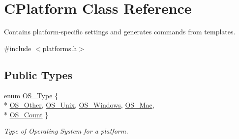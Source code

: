 \hypertarget{classCPlatform}{\section{C\-Platform Class Reference}
\label{classCPlatform}
}


Contains platform-\/specific settings and generates commands from templates.  




{\ttfamily \#include $<$platforms.\-h$>$}

\subsection*{Public Types}
\begin{DoxyCompactItemize}
\item 
enum \hyperlink{classCPlatform_a2fb735c63c53052f79629e338bb0f535}{O\-S\-\_\-\-Type} \{ \\*
\hyperlink{classCPlatform_a2fb735c63c53052f79629e338bb0f535a46c8caab43a05219980b2429a14ed464}{O\-S\-\_\-\-Other}, 
\hyperlink{classCPlatform_a2fb735c63c53052f79629e338bb0f535acb733abbbf865ee0c639e423ce88c445}{O\-S\-\_\-\-Unix}, 
\hyperlink{classCPlatform_a2fb735c63c53052f79629e338bb0f535acd2c66cea48c61e7bcd49987d6cbf8a0}{O\-S\-\_\-\-Windows}, 
\hyperlink{classCPlatform_a2fb735c63c53052f79629e338bb0f535ab3d15e3dfe0489aa251e0727858c3066}{O\-S\-\_\-\-Mac}, 
\\*
\hyperlink{classCPlatform_a2fb735c63c53052f79629e338bb0f535a615f7cf356da8d62358aa9fc92c1f9ad}{O\-S\-\_\-\-Count}
 \}
\begin{DoxyCompactList}\small\item\em Type of Operating System for a platform. \end{DoxyCompactList}\end{DoxyCompactItemize}
